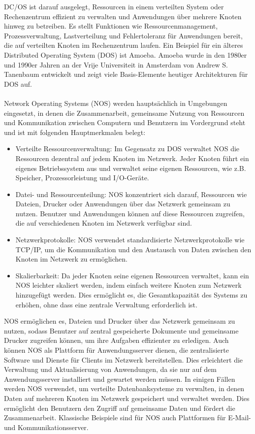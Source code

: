 DC/OS ist darauf ausgelegt, Ressourcen in einem verteilten System oder Rechenzentrum effizient zu verwalten und Anwendungen über mehrere Knoten hinweg zu betreiben. Es stellt Funktionen wie Ressourcenmanagement, Prozessverwaltung, Lastverteilung und Fehlertoleranz für Anwendungen bereit, die auf verteilten Knoten im Rechenzentrum laufen. Ein Beispiel für ein  älteres Distributed Operating System (DOS) ist Amoeba. Amoeba wurde in den 1980er und 1990er Jahren an der Vrije Universiteit in Amsterdam von Andrew S. Tanenbaum entwickelt und zeigt viele Basis-Elemente heutiger Architekturen für DOS auf. 
\\\\
Network Operating Systems (NOS) werden hauptsächlich in Umgebungen eingesetzt, in denen die Zusammenarbeit, gemeinsame Nutzung von Ressourcen und Kommunikation zwischen Computern und Benutzern im Vordergrund steht und ist mit folgenden Hauptmerkmalen belegt: 
\begin{itemize}
\item Verteilte Ressourcenverwaltung: Im Gegensatz zu DOS verwaltet NOS die Ressourcen dezentral auf jedem Knoten im Netzwerk. Jeder Knoten führt ein eigenes Betriebssystem aus und verwaltet seine eigenen Ressourcen, wie z.B. Speicher, Prozessorleistung und I/O-Geräte.
\item Datei- und Ressourcenteilung: NOS konzentriert sich darauf, Ressourcen wie Dateien, Drucker oder Anwendungen über das Netzwerk gemeinsam zu nutzen. Benutzer und Anwendungen können auf diese Ressourcen zugreifen, die auf verschiedenen Knoten im Netzwerk verfügbar sind.
\item Netzwerkprotokolle: NOS verwendet standardisierte Netzwerkprotokolle wie TCP/IP, um die Kommunikation und den Austausch von Daten zwischen den Knoten im Netzwerk zu ermöglichen.
\item Skalierbarkeit: Da jeder Knoten seine eigenen Ressourcen verwaltet, kann ein NOS leichter skaliert werden, indem einfach weitere Knoten zum Netzwerk hinzugefügt werden. Dies ermöglicht es, die Gesamtkapazität des Systems zu erhöhen, ohne dass eine zentrale Verwaltung erforderlich ist.
\end{itemize}

NOS ermöglichen es, Dateien und Drucker über das Netzwerk gemeinsam zu nutzen, sodass Benutzer auf zentral gespeicherte Dokumente und gemeinsame Drucker zugreifen können, um ihre Aufgaben effizienter zu erledigen. Auch können NOS als Plattform für Anwendungsserver dienen, die zentralisierte Software und Dienste für Clients im Netzwerk bereitstellen. Dies erleichtert die Verwaltung und Aktualisierung von Anwendungen, da sie nur auf dem Anwendungsserver installiert und gewartet werden müssen. In einigen Fällen werden NOS verwendet, um verteilte Datenbanksysteme zu verwalten, in denen Daten auf mehreren Knoten im Netzwerk gespeichert und verwaltet werden. Dies ermöglicht den Benutzern den Zugriff auf gemeinsame Daten und fördert die Zusammenarbeit. Klassische Beispiele sind für NOS auch Plattformen für E-Mail- und Kommunikationsserver.

